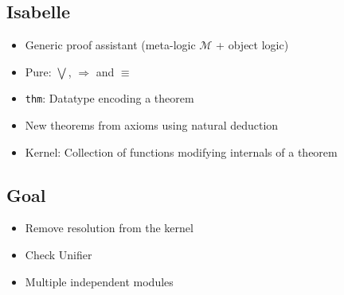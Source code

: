 \subsection{Isabelle}
\begin{frame}
  \begin{itemize}[<+->]
  	\item Generic proof assistant (meta-logic $\mathcal{M}$ + object logic)
    \item Pure: $\bigvee$, $\Longrightarrow$ and $\equiv$
    \item \texttt{thm}: Datatype encoding a theorem
    \item New theorems from axioms using natural deduction
    \item Kernel: Collection of functions modifying internals of a theorem
  \end{itemize}
\end{frame}

\begin{frame}
\begin{center}
\end{center}
\end{frame}

\subsection{Goal}
\begin{frame}
  \begin{itemize}[<+->]
  	\item Remove resolution from the kernel
    \item Check Unifier
    \item Multiple independent modules
  \end{itemize}
\end{frame}